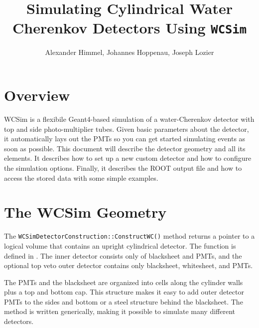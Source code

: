
\author{Alexander Himmel, Johannes Hoppenau, Joseph Lozier}
\title{Simulating Cylindrical Water Cherenkov Detectors Using \texttt{WCSim}}



\maketitle
\tableofcontents


\section{Overview}

WCSim is a flexibile Geant4-based simulation of a water-Cherenkov detector with top and side photo-multiplier tubes.  Given basic parameters about the detector, it automatically lays out the PMTs so you can get started simulating events as soon as possible.  This document will describe the detector geometry and all its elements.  It describes how to set up a new custom detector and how to configure the simulation options.  Finally, it describes the ROOT output file and how to access the stored data with some simple examples.


\section{The WCSim Geometry}
The \texttt{WCSimDetectorConstruction::ConstructWC()} method returns a pointer to a logical volume that contains an upright cylindrical detector. The function is defined in . The inner detector consists only of blacksheet and PMTs, and the optional top veto outer detector contains only blacksheet, whitesheet, and PMTs.

The PMTs and the blacksheet are organized into cells along the cylinder walls plus a top and bottom cap. This structure makes it easy to add outer detector PMTs to the sides and bottom or a steel structure behind the blacksheet. The method is written generically, making it possible to simulate many different detectors. 

